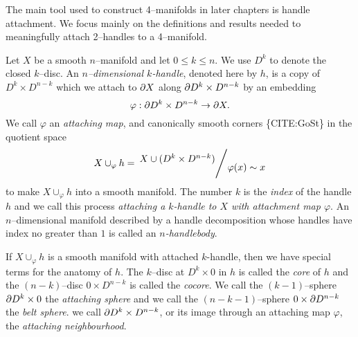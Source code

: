 The main tool used to construct 4--manifolds in later chapters is handle attachment.
We focus mainly on the definitions and results needed to meaningfully attach 2--handles to a 4--manifold.

\begin{defn}
\label{def:handle}
Let $X$ be a smooth $n$--manifold and let $0\leq k\leq n$.
We use $D^k$ to denote the closed $k$--disc.
An \emph{$n$--dimensional $k$-handle}, denoted here by $h$, is a copy of $D^k\times D^{n-k}$ which we attach to $\partial X$ along $\partial D^k\times D^{n-k}$ by an embedding
\[
  \varphi : \partial D^k \times D^{n-k} \to \partial X.
\]
We call $\varphi$ an \emph{attaching map}, and canonically smooth corners \{CITE:GoSt\} in the quotient space
\[
  X\cup_\varphi h = \quotient{X \cup ( D^k\times D^{n-k} ) }{ \varphi(x) \sim x }
\]
to make $X\cup_\varphi h$ into a smooth manifold.
The number $k$ is the \emph{index} of the handle $h$ and we call this process \emph{attaching a $k$-handle to $X$ with attachment map $\varphi$}.
An $n$--dimensional manifold described by a handle decomposition whose handles have index no greater than $1$ is called an \emph{$n$-handlebody}.
\end{defn}

If $X\cup_\varphi h$ is a smooth manifold with attached $k$-handle, then we have special terms for the anatomy of $h$.
The $k$--disc at $D^k\times 0$ in $h$ is called the \emph{core} of $h$ and the $(n-k)$--disc $0 \times D^{n-k}$ is called the \emph{cocore}.
We call the $(k-1)$--sphere $\partial D^k \times 0$ the \emph{attaching sphere} and we call the $(n-k-1)$--sphere $ 0 \times \partial D^{n-k}$ the \emph{belt sphere}.
we call $\partial D^k\times D^{n-k}$, or its image through an attaching map $\varphi$, the \emph{attaching neighbourhood}.

